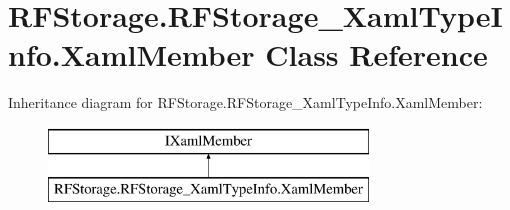 \hypertarget{class_r_f_storage_1_1_r_f_storage___xaml_type_info_1_1_xaml_member}{}\section{R\+F\+Storage.\+R\+F\+Storage\+\_\+\+Xaml\+Type\+Info.\+Xaml\+Member Class Reference}
\label{class_r_f_storage_1_1_r_f_storage___xaml_type_info_1_1_xaml_member}
Inheritance diagram for R\+F\+Storage.\+R\+F\+Storage\+\_\+\+Xaml\+Type\+Info.\+Xaml\+Member\+:\begin{figure}[H]
\begin{center}
\leavevmode
\includegraphics[height=2.000000cm]{class_r_f_storage_1_1_r_f_storage___xaml_type_info_1_1_xaml_member}
\end{center}
\end{figure}
